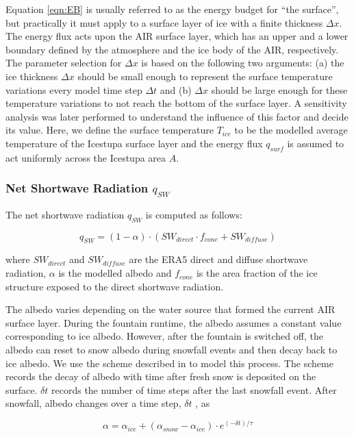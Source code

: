 \documentclass[utf8]{frontiersSCNS} %
\begin{document}
Equation \ref{eqn:EB} is usually referred to as the energy budget for “the surface”, but practically it must apply to a
surface layer of ice with a finite thickness $\Delta x$. The energy flux acts upon the AIR surface layer, which has an
upper and a lower boundary defined by the atmosphere and the ice body of the AIR, respectively. The parameter selection
for $\Delta x$ is based on the following two arguments: (a) the ice thickness $\Delta x$ should be small enough to
represent the surface temperature variations every model time step $\Delta t$ and (b) $\Delta x$ should be large enough
for these temperature variations to not reach the bottom of the surface layer. A sensitivity analysis was later
performed to understand the influence of this factor and decide its value. Here, we define the surface temperature
$T_{ice}$ to be the modelled average temperature of the Icestupa surface layer and the energy flux $q_{surf}$ is assumed
to act uniformly across the Icestupa area $A$.

\subsubsection{Net Shortwave Radiation \texorpdfstring{$q_{SW}$}{Lg}}

The net shortwave radiation $q_{SW}$ is computed as follows:

\begin{equation} q_{SW} = (1- \alpha)\cdot (SW_{direct} \cdot f_{cone} + SW_{diffuse}) \label{eqn:SW} \end{equation}

where $SW_{direct}$ and $SW_{diffuse}$ are the ERA5 direct and diffuse shortwave radiation, $\alpha$ is the modelled
albedo and $f_{cone}$ is the area fraction of the ice structure exposed to the direct shortwave radiation.

The albedo varies depending on the water source that formed the current AIR surface layer. During the fountain
runtime, the albedo assumes a constant value corresponding to ice albedo. However, after the fountain is
switched off, the albedo can reset to snow albedo during snowfall events and then decay back to ice albedo. We use
the scheme described in \cite{OerlemansKnap_1998} to model this process. The scheme records the decay of albedo
with time after fresh snow is deposited on the surface. $\delta t$ records the number of time steps after the last
snowfall event. After snowfall, albedo changes over a time step, $\delta t$ , as

\begin{equation} \alpha=\alpha_{ice}+(\alpha_{snow}-\alpha_{ice}) \cdot e^{(-\delta t)/\tau} \label{eqn:a}
\end{equation}
\end{document}
